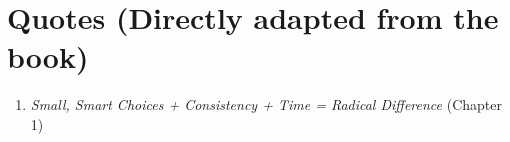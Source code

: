 \section*{Quotes (Directly adapted from the book)}
\begin{enumerate}
    \item \emph{Small, Smart Choices + Consistency + Time = Radical Difference} (Chapter 1)
\end{enumerate}